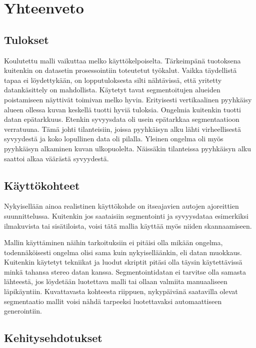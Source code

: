 \chapter{Yhteenveto}%
\label{ch:yhteenveto}

\section{Tulokset}

Koulutettu malli vaikuttaa melko käyttökelpoiselta. Tärkeimpänä tuotoksena kuitenkin on datasetin prosessointiin toteutetut työkalut.
Vaikka täydellistä tapaa ei löydettykään, on lopputuloksesta silti nähtävissä, että yritetty datankäsittely on mahdollista.
Käytetyt tavat segmentoitujen alueiden poistamiseen näyttivät toimivan melko hyvin.
Erityisesti vertikaalinen pyyhkäisy alueen ollessa kuvan keskellä tuotti hyviä tuloksia. 
Ongelmia kuitenkin tuotti datan epätarkkuus.
Etenkin syvyysdata oli usein epätarkkaa segmentaatioon verratuuna. Tämä johti tilanteisiin, joissa pyyhkäisyn alku lähti virheellisestä syvyydestä ja koko lopullinen data oli pilalla. Yleinen ongelma oli myös pyyhkäisyn alkaminen kuvan ulkopuolelta.
Näissäkin tilanteissa pyyhkäisyn alku saattoi alkaa väärästä syvyydestä.

\section{Käyttökohteet}

Nykyisellään ainoa realistinen käyttökohde on itseajavien autojen ajoreittien suunnittelussa. Kuitenkin jos saataisiin segmentointi ja syvyysdataa esimerkiksi ilmakuvista tai sisätiloista, voisi tätä mallia käyttää myös niiden skannaamiseen.

Mallin käyttäminen näihin tarkoituksiin ei pitäisi olla mikään ongelma, todennäköisesti ongelma olisi sama kuin nykyiselläänkin, eli datan muokkaus.
Kuitenkin käytetyt tekniikat ja luodut skriptit pitäsi olla täysin käytettävissä minkä tahansa stereo datan kanssa.
Segmentointidatan ei tarvitse olla samasta lähteestä, jos löydetään luotettava malli tai ollaan valmiita manuaaliseen läpikäyntiin.
Kuvattavasta kohteesta riippuen, nykypäivänä saatavilla olevat segmentaatio mallit voisi nähdä tarpeeksi luotettavaksi automaattiseen generointiin.

\section{Kehitysehdotukset}


